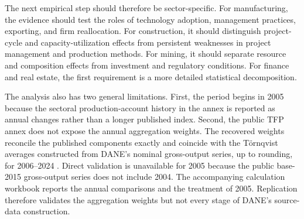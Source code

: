 The next empirical step should therefore be sector-specific. For manufacturing, the evidence should test the roles of technology adoption, management practices, exporting, and firm reallocation. For construction, it should distinguish project-cycle and capacity-utilization effects from persistent weaknesses in project management and production methods. For mining, it should separate resource and composition effects from investment and regulatory conditions. For finance and real estate, the first requirement is a more detailed statistical decomposition.

The analysis also has two general limitations. First, the period begins in 2005 because the sectoral production-account history in the annex is reported as annual changes rather than a longer published index. Second, the public TFP annex does not expose the annual aggregation weights. The recovered weights reconcile the published components exactly and coincide with the T\"ornqvist averages constructed from DANE's nominal gross-output series, up to rounding, for 2006--2024 \citep{DANE2020COU,DANE2026COU}. Direct validation is unavailable for 2005 because the public base-2015 gross-output series does not include 2004. The accompanying calculation workbook reports the annual comparisons and the treatment of 2005. Replication therefore validates the aggregation weights but not every stage of DANE's source-data construction.
